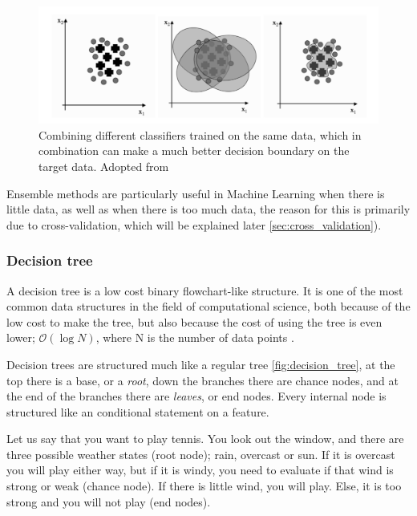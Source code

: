 \begin{figure}[h]
     \centering
     \includegraphics[width=\linewidth]{theory/figures/ensemble_learning.png}
     \caption{Combining different classifiers trained on the same data, which in combination can make a much better decision boundary on the target data. Adopted from \cite{marsland2014machine}}
     \label{fig:ensemble_learning}
\end{figure}	

Ensemble methods are particularly useful in Machine Learning when there is little data, as well as when there is too much data, the reason for this is primarily due to cross-validation, which will be explained later \ref{sec:cross_validation}).

\subsubsection{Decision tree}

A decision tree is a low cost binary flowchart-like structure. It is one of the most common data structures in the field of computational science, both because of the low cost to make the tree, but also because the cost of using the tree is even lower; $\mathcal{O}(\log{N})$, where N is the number of data points \cite{marsland2014machine}.

Decision trees are structured much like a regular tree \ref{fig:decision_tree}, at the top there is a base, or a \textit{root}, down the branches there are chance nodes, and at the end of the branches there are \textit{leaves}, or end nodes. Every internal node is structured like an conditional statement on a feature.

Let us say that you want to play tennis. You look out the window, and there are three possible weather states (root node); rain, overcast or sun. If it is overcast you will play either way, but if it is windy, you need to evaluate if that wind is strong or weak (chance node). If there is little wind, you will play. Else, it is too strong and you will not play (end nodes).

